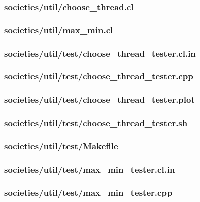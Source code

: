 \documentclass{article}
\begin{document}
\subsubsection*{societies/util/choose\_thread.cl}


\subsubsection*{societies/util/max\_min.cl}


\subsubsection*{societies/util/test/choose\_thread\_tester.cl.in}


\subsubsection*{societies/util/test/choose\_thread\_tester.cpp}


\subsubsection*{societies/util/test/choose\_thread\_tester.plot}


\subsubsection*{societies/util/test/choose\_thread\_tester.sh}


\subsubsection*{societies/util/test/Makefile}


\subsubsection*{societies/util/test/max\_min\_tester.cl.in}


\subsubsection*{societies/util/test/max\_min\_tester.cpp}

\end{document}
